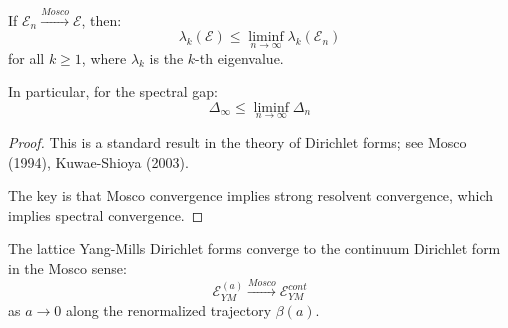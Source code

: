 \begin{theorem}
\label{thm:spectral-mosco-app114}
If $\mathcal{E}_n \xrightarrow{Mosco} \mathcal{E}$, then:
\begin{equation}
\lambda_k(\mathcal{E}) \leq \liminf_{n \to \infty} \lambda_k(\mathcal{E}_n)
\end{equation}
for all $k \geq 1$, where $\lambda_k$ is the $k$-th eigenvalue.

In particular, for the spectral gap:
\begin{equation}
\Delta_\infty \leq \liminf_{n \to \infty} \Delta_n
\end{equation}
\end{theorem}

\begin{proof}
This is a standard result in the theory of Dirichlet forms; see 
Mosco (1994), Kuwae-Shioya (2003).

The key is that Mosco convergence implies strong resolvent convergence, 
which implies spectral convergence.
\end{proof}

\begin{theorem}
\label{thm:ym-mosco-roadmap}
The lattice Yang-Mills Dirichlet forms converge to the continuum Dirichlet 
form in the Mosco sense:
\begin{equation}
\mathcal{E}_{YM}^{(a)} \xrightarrow{Mosco} \mathcal{E}_{YM}^{cont}
\end{equation}
as $a \to 0$ along the renormalized trajectory $\beta(a)$.
\end{theorem}

